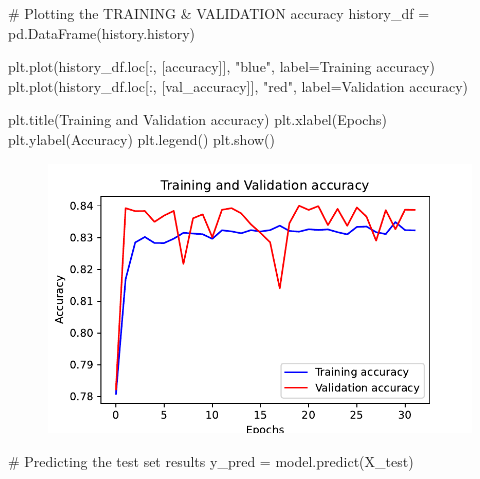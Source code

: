 \documentclass[
  letterpaper,
  DIV=11,
  numbers=noendperiod]{scrartcl}
\newenvironment{Shaded}{\begin{snugshade}}{\end{snugshade}}
\newcommand{\CommentTok}[1]{\textcolor[rgb]{0.37,0.37,0.37}{#1}}
\newcommand{\NormalTok}[1]{\textcolor[rgb]{0.00,0.23,0.31}{#1}}
\newcommand{\OperatorTok}[1]{\textcolor[rgb]{0.37,0.37,0.37}{#1}}
\newcommand{\StringTok}[1]{\textcolor[rgb]{0.13,0.47,0.30}{#1}}
\begin{document}
\begin{Shaded}
\begin{Highlighting}[]
\CommentTok{\# Plotting the TRAINING \& VALIDATION accuracy}
\NormalTok{history\_df }\OperatorTok{=}\NormalTok{ pd.DataFrame(history.history)}

\NormalTok{plt.plot(history\_df.loc[:, [}\StringTok{\textquotesingle{}accuracy\textquotesingle{}}\NormalTok{]], }\StringTok{"blue"}\NormalTok{, label}\OperatorTok{=}\StringTok{\textquotesingle{}Training accuracy\textquotesingle{}}\NormalTok{)}
\NormalTok{plt.plot(history\_df.loc[:, [}\StringTok{\textquotesingle{}val\_accuracy\textquotesingle{}}\NormalTok{]], }\StringTok{"red"}\NormalTok{, label}\OperatorTok{=}\StringTok{\textquotesingle{}Validation accuracy\textquotesingle{}}\NormalTok{)}

\NormalTok{plt.title(}\StringTok{\textquotesingle{}Training and Validation accuracy\textquotesingle{}}\NormalTok{)}
\NormalTok{plt.xlabel(}\StringTok{\textquotesingle{}Epochs\textquotesingle{}}\NormalTok{)}
\NormalTok{plt.ylabel(}\StringTok{\textquotesingle{}Accuracy\textquotesingle{}}\NormalTok{)}
\NormalTok{plt.legend()}
\NormalTok{plt.show()}
\end{Highlighting}
\end{Shaded}

\begin{figure}[H]

{\centering \includegraphics{RainAus_EDA_files/figure-pdf/unnamed-chunk-30-1.pdf}

}

\end{figure}

\begin{Shaded}
\begin{Highlighting}[]
\CommentTok{\# Predicting the test set results}
\NormalTok{y\_pred }\OperatorTok{=}\NormalTok{ model.predict(X\_test)}
\end{Highlighting}
\end{Shaded}
\end{document}
